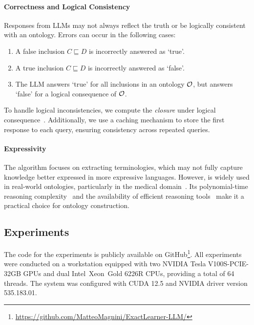 \paragraph{Correctness and Logical Consistency}
\label{par:correctness-and-consistency}
%
Responses from \glspl{LLM} may not always reflect the truth or be logically consistent with an \EL ontology.
%
Errors can occur in the following cases:
%
\begin{enumerate}
    \item A false inclusion $C \sqsubseteq D$ is incorrectly answered as `true'.
    \item A true inclusion $C \sqsubseteq D$ is incorrectly answered as `false'.
    \item The \gls{LLM} answers `true' for all inclusions in an ontology $\mathcal{O}$, but answers `false' for a logical consequence of $\mathcal{O}$.
\end{enumerate}
%
To handle logical inconsistencies, we compute the \emph{closure} under logical consequence~\cite{BLUM2023109026}.
%
Additionally, we use a caching mechanism to store the first response to each query, ensuring consistency across repeated queries.

%
\paragraph{Expressivity}
\label{par:expressivity}
%
The algorithm focuses on extracting \EL terminologies, which may not fully capture knowledge better expressed in more expressive languages.
%
However, \EL is widely used in real-world ontologies, particularly in the medical domain~\cite{Rector2008TheGH,bioportal}.
%
Its polynomial-time reasoning complexity~\cite{DBLP:conf/ijcai/BaaderBL05} and the availability of efficient reasoning tools~\cite{DBLP:journals/jar/KazakovKS14} make it a practical choice for ontology construction.



\subsection{Experiments}
\label{subsec:experiments}

The code for the experiments is publicly available on GitHub\footnote{\url{https://github.com/MatteoMagnini/ExactLearner-LLM/}}.
%
All experiments were conducted on a workstation equipped with two NVIDIA Tesla V100S-PCIE-32GB GPUs and dual Intel\textcopyright~Xeon\textcopyright~Gold 6226R CPUs, providing a total of 64 threads.
%
The system was configured with CUDA 12.5 and NVIDIA driver version 535.183.01.
%

